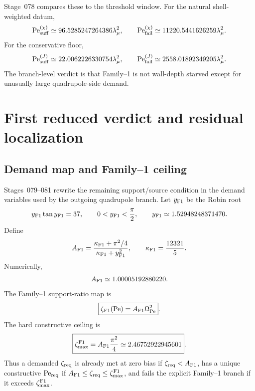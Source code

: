 Stage~078 compares these to the threshold window.  For the natural shell-weighted datum,
\begin{equation}
\label{eq:part03-Pe-suff-fail-chi}
\mathrm{Pe}_{\rm suff}^{(\chi)}
\simeq96.5285247264386\lambda_\mu^2,
\qquad
\mathrm{Pe}_{\rm fail}^{(\chi)}
\simeq11220.5441626259\lambda_\mu^2.
\end{equation}
For the conservative floor,
\begin{equation}
\label{eq:part03-Pe-suff-fail-J}
\mathrm{Pe}_{\rm suff}^{(J)}
\simeq22.0062226330754\lambda_\mu^2,
\qquad
\mathrm{Pe}_{\rm fail}^{(J)}
\simeq2558.01892349205\lambda_\mu^2.
\end{equation}
The branch-level verdict is that Family--1 is not wall-depth starved except for unusually large quadrupole-side demand.

\section{First reduced verdict and residual localization}
\label{sec:part03_support_family1:first-reduced-verdict-and-residual-localization}

\subsection{Demand map and Family--1 ceiling}
\label{subsec:part03-demand-map}

Stages~079--081 rewrite the remaining support/source condition in the demand variables used by the outgoing quadrupole branch.  Let \(y_{\rm F1}\) be the Robin root
\begin{equation}
\label{eq:part03-yF1}
y_{\rm F1}\tan y_{\rm F1}=37,
\qquad
0<y_{\rm F1}<\frac{\pi}{2},
\qquad
 y_{\rm F1}\simeq1.52948248371470.
\end{equation}
Define
\begin{equation}
\label{eq:part03-AF1}
A_{\rm F1}=\frac{\kappa_{\rm F1}+\pi^2/4}{\kappa_{\rm F1}+y_{\rm F1}^2},
\qquad
\kappa_{\rm F1}=\frac{12321}{5}.
\end{equation}
Numerically,
\begin{equation}
\label{eq:part03-AF1-value}
A_{\rm F1}\simeq1.00005192880220.
\end{equation}
The Family--1 support-ratio map is
\begin{equation}
\label{eq:part03-zeta-F1}
\boxed{
\zeta_{\rm F1}(\mathrm{Pe})=A_{\rm F1}\Omega_{\mathrm{Pe}}^2}.
\end{equation}
The hard constructive ceiling is
\begin{equation}
\label{eq:part03-zeta-max-F1}
\boxed{
\zeta_{\max}^{\rm F1}=A_{\rm F1}\frac{\pi^2}{4}
\simeq2.46752922945601}.
\end{equation}
Thus a demanded \(\zeta_{\rm req}\) is already met at zero bias if \(\zeta_{\rm req}<A_{\rm F1}\), has a unique constructive \(\mathrm{Pe}_{\rm req}\) if \(A_{\rm F1}\leq\zeta_{\rm req}\leq\zeta_{\max}^{\rm F1}\), and fails the explicit Family--1 branch if it exceeds \(\zeta_{\max}^{\rm F1}\).


